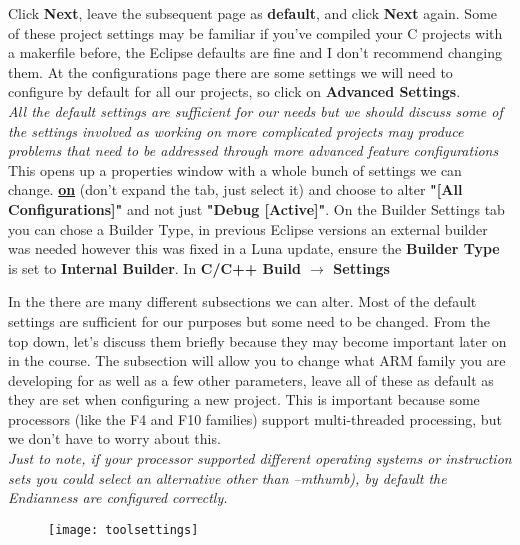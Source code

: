 {{\par
Click \textbf{\color{Purple} Next}, leave the subsequent page as \textbf{\color{Purple} default}, and click \textbf{\color{Purple} Next} again. Some of these project settings may be familiar if you've compiled your C projects with a makerfile before, the Eclipse defaults are fine and I don't recommend changing them. 
At the configurations page there are some settings we will need to configure by default for all our projects, so click on \textbf{\color{Green} Advanced Settings}.
\\
\emph{\color{Gray} All the default settings are sufficient for our needs but we should discuss some of the settings involved as working on more complicated projects may produce problems that need to be addressed through more advanced feature configurations}
\newpage
This opens up a properties window with a whole bunch of settings we can change. \textbf{\color{Purple} \underline{ on}} \textbf{\color{Purple} \underline{}} (don't expand the tab, just select it) and choose to alter \textbf{\color{Purple} "[All Configurations]"} and not just \textbf{"Debug [Active]"}.
On the Builder Settings tab you can chose a Builder Type, in previous Eclipse versions an external builder was needed however this was fixed in a Luna update, ensure the \textbf{Builder Type} is set to \textbf{\color{Purple} Internal Builder}.
In \textbf{\color{Green} C/C++ Build $\rightarrow$ Settings} 
\par
In the \underline{} there are many different subsections we can alter. Most of the default settings are sufficient for our purposes but some need to be changed.  From the top down, let's discuss them briefly because they may become important later on in the course. The \underline{} subsection will allow you to change what ARM family you are developing for as well as a few other parameters, leave all of these as default as they are set when configuring a new project. This is important because some processors (like the F4 and F10 families) support multi-threaded processing, but we don’t have to worry about this.
\\
\emph{\color{Gray} Just to note, if your processor supported different operating systems or instruction sets you could select an alternative other than –mthumb), by default the Endianness are configured correctly.}
\begin{figure}[hbtp]
\centering
\texttt{[image: toolsettings]}
\end{figure}
}}
